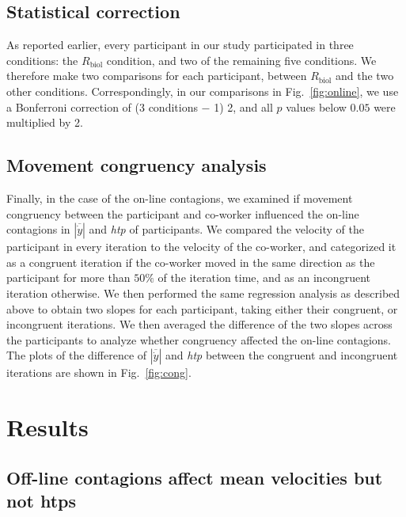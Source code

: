\subsection{Statistical correction}
As reported earlier, every participant in our study participated in three conditions: the $R_{\text{biol}}$ condition, and two of the remaining five conditions. We therefore make two comparisons for each participant, between $R_{\text{biol}}$ and the two other conditions. Correspondingly, in our comparisons in Fig.~\ref{fig:online}, we use a Bonferroni correction of (3 conditions $-$ 1) 2, and all $p$ values below $0.05$ were multiplied by 2.

\subsection{Movement congruency analysis} \label{congSec}
Finally, in the case of the on-line contagions, we examined if movement congruency between the participant and co-worker influenced the on-line contagions in $|\overline{\dot{y}}|$ and {\it htp} of participants. We compared the velocity of the participant in every iteration to the velocity of the co-worker, and categorized it as a congruent iteration if the co-worker moved in the same direction as the participant for more than $50\%$ of the iteration time, and as an incongruent iteration otherwise. We then performed the same regression analysis as described above to obtain two slopes for each participant, taking either their congruent, or incongruent iterations. We then averaged the difference of the two slopes across the participants to analyze whether congruency affected the on-line contagions. The plots of the difference of $|\overline{\dot{y}}|$ and {\it htp} between the congruent and incongruent iterations are shown in Fig.~\ref{fig:cong}.



\clearpage
\section{Results}

\subsection{Off-line contagions affect mean velocities but not htps}

